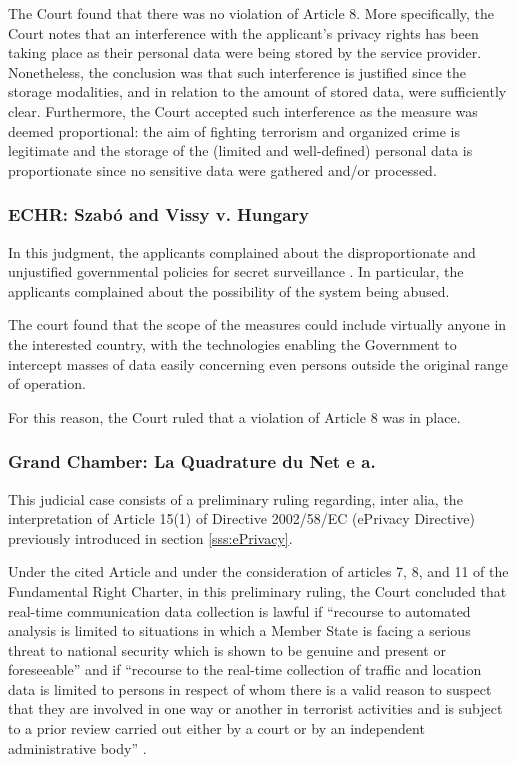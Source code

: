 The Court found that there was no violation of Article 8. More specifically, the Court notes that an interference with the applicant's privacy rights has been taking place as their personal data were being stored by the service provider. Nonetheless, the conclusion was that such interference is justified since the storage modalities, and in relation to the amount of stored data, were sufficiently clear. Furthermore, the Court accepted such interference as the measure was deemed proportional: the aim of fighting terrorism and organized crime is legitimate and the storage of the (limited and well-defined) personal data is proportionate since no sensitive data were gathered and/or processed.

\subsubsection{ECHR: Szabó and Vissy v. Hungary}

In this judgment, the applicants complained about the disproportionate and unjustified governmental policies for secret surveillance \cite{Hungary}. In particular, the applicants complained about the possibility of the system being abused. 

The court found that the scope of the measures could include virtually anyone in the interested country, with the technologies enabling the Government to intercept masses of data easily concerning even persons outside the original range of operation.

For this reason, the Court ruled that a violation of Article 8 was in place.

\subsubsection{Grand Chamber: La Quadrature du Net e a.}
\label{sss:quad}

This judicial case consists of a preliminary ruling regarding, inter alia, the interpretation of Article 15(1) of Directive 2002/58/EC (ePrivacy Directive) previously introduced in section \ref{sss:ePrivacy}.

Under the cited Article and under the consideration of articles 7, 8, and 11 of the Fundamental Right Charter, in this preliminary ruling, the Court concluded that real-time communication data collection is lawful if ``recourse to automated analysis is limited to situations in which a Member State is facing a serious threat to national security which is shown to be genuine and present or foreseeable'' \cite{Grand_chamber} and if ``recourse to the real-time collection of traffic and location data is limited to persons in respect of whom there is a valid reason to suspect that they are involved in one way or another in terrorist activities and is subject to a prior review carried out either by a court or by an independent administrative body'' \cite{Grand_chamber}.

